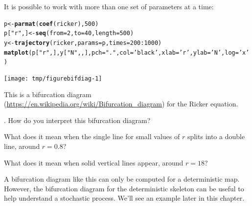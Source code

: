 \documentclass{beamer}\usepackage[]{graphicx}\usepackage[]{color}
\makeatletter
\newcommand{\hlnum}[1]{\textcolor[rgb]{0.686,0.059,0.569}{#1}}%
\newcommand{\hlstr}[1]{\textcolor[rgb]{0.192,0.494,0.8}{#1}}%
\newcommand{\hlopt}[1]{\textcolor[rgb]{0,0,0}{#1}}%
\newcommand{\hlstd}[1]{\textcolor[rgb]{0.345,0.345,0.345}{#1}}%
\newcommand{\hlkwb}[1]{\textcolor[rgb]{0.69,0.353,0.396}{#1}}%
\newcommand{\hlkwc}[1]{\textcolor[rgb]{0.333,0.667,0.333}{#1}}%
\newcommand{\hlkwd}[1]{\textcolor[rgb]{0.737,0.353,0.396}{\textbf{#1}}}%
\newenvironment{kframe}{%
 \def\at@end@of@kframe{}%
 \ifinner\ifhmode%
  \def\at@end@of@kframe{\end{minipage}}%
  \begin{minipage}{\columnwidth}%
 \fi\fi%
 \def\FrameCommand##1{\hskip\@totalleftmargin \hskip-\fboxsep
 \colorbox{shadecolor}{##1}\hskip-\fboxsep
     \hskip-\linewidth \hskip-\@totalleftmargin \hskip\columnwidth}%
 \MakeFramed {\advance\hsize-\width
   \@totalleftmargin\z@ \linewidth\hsize
   \@setminipage}}%
 {\par\unskip\endMakeFramed%
 \at@end@of@kframe}
\newenvironment{knitrout}{}{} %
\newcommand\answer[2]{#1} %
\makeatother
\begin{document}
\begin{frame}[fragile]

It is possible to work with more than one set of parameters at a time:

\begin{knitrout}\small
{}\color{fgcolor}\begin{kframe}
\begin{alltt}
\hlstd{p} \hlkwb{<-} \hlkwd{parmat}\hlstd{(}\hlkwd{coef}\hlstd{(ricker),}\hlnum{500}\hlstd{)}
\hlstd{p[}\hlstr{"r"}\hlstd{,]} \hlkwb{<-} \hlkwd{seq}\hlstd{(}\hlkwc{from}\hlstd{=}\hlnum{2}\hlstd{,}\hlkwc{to}\hlstd{=}\hlnum{40}\hlstd{,}\hlkwc{length}\hlstd{=}\hlnum{500}\hlstd{)}
\hlstd{y} \hlkwb{<-} \hlkwd{trajectory}\hlstd{(ricker,}\hlkwc{params}\hlstd{=p,}\hlkwc{times}\hlstd{=}\hlnum{200}\hlopt{:}\hlnum{1000}\hlstd{)}
\hlkwd{matplot}\hlstd{(p[}\hlstr{"r"}\hlstd{,],y[}\hlstr{"N"}\hlstd{,,],}\hlkwc{pch}\hlstd{=}\hlstr{"."}\hlstd{,}\hlkwc{col}\hlstd{=}\hlstr{'black'}\hlstd{,}\hlkwc{xlab}\hlstd{=}\hlstr{'r'}\hlstd{,}\hlkwc{ylab}\hlstd{=}\hlstr{'N'}\hlstd{,}\hlkwc{log}\hlstd{=}\hlstr{'x'}\hlstd{)}
\end{alltt}
\end{kframe}
\end{knitrout}

\vspace{-1mm}

\begin{knitrout}\small
{}\color{fgcolor}

{\centering \texttt{[image: tmp/figurebifdiag-1]} 

}



\end{knitrout}

This is a bifurcation diagram (\url{https://en.wikipedia.org/wiki/Bifurcation_diagram}) for the Ricker equation.

\end{frame}

\begin{frame}[fragile]

\myquestion. How do you interpret this bifurcation diagram? 
\bi
\item What does it mean when the single line for small values of $r$ splits into a double line, around $r=0.8$? 

\answer{\vspace{25mm}}{todo}

\item What does it mean when solid vertical lines appear, around $r=18$?

\answer{\vspace{25mm}}{todo}

\item A bifurcation diagram like this can only be computed for a deterministic map. However, the bifurcation diagram for the deterministic skeleton can be useful to help understand a stochastic process. We'll see an example later in this chapter.

\ei

\end{frame}
\end{document}
